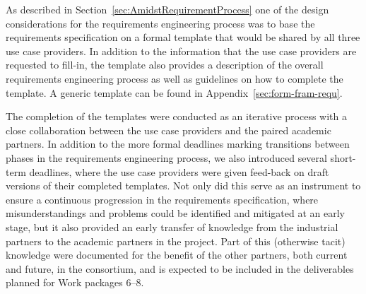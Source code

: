


As described in Section~\ref{sec:AmidstRequirementProcess} one of the design considerations for the requirements
engineering process was to base the requirements specification on a formal template that would be shared by
all three use case providers. In addition to the information that the use case providers are requested to fill-in, the
template also provides a description of the overall requirements engineering process as well as guidelines on how to
complete the template. A generic template can be found in Appendix~\ref{sec:form-fram-requ}.

  

The completion of the templates were conducted as an iterative process with a close collaboration between the use case
providers and the paired academic partners. In addition to the more formal deadlines marking transitions between 
phases in the requirements engineering process, we also introduced several short-term deadlines, where
the use case providers were given feed-back on draft versions of their completed templates. Not only did this serve as an
instrument to ensure a continuous progression in the requirements specification, where misunderstandings and problems
could be identified and mitigated at an early stage, but it also provided an early transfer of knowledge from the
industrial partners to the academic partners in the project. Part of this (otherwise tacit) knowledge were documented
for the benefit of the other partners, both current and future, in the consortium, and is expected to be included 
in the deliverables planned for Work packages 6--8. 

